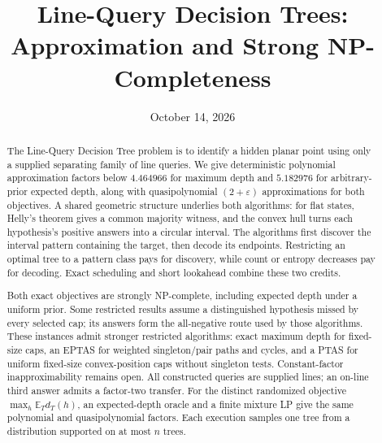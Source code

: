 \documentclass[11pt]{article}
\title{Line-Query Decision Trees:\\
Approximation and Strong NP-Completeness}
\author{}
\date{October 14, 2026}
\theoremstyle{definition}
\theoremstyle{remark}
\begin{document}
\maketitle

\begin{abstract}
The Line-Query Decision Tree problem is to identify a hidden planar
point using only a supplied separating family of line queries. We give
deterministic polynomial approximation factors below $4.464966$ for
maximum depth and $5.182976$ for arbitrary-prior expected depth, along
with quasipolynomial
$(2+\varepsilon)$ approximations for both objectives. A shared
geometric structure underlies both algorithms: for flat states,
Helly's theorem gives a common majority witness, and
the convex hull turns each hypothesis's positive answers into a
circular interval. The algorithms first discover the interval pattern
containing the target, then decode its endpoints. Restricting an
optimal tree to a pattern class pays for discovery, while count or
entropy decreases pay for decoding. Exact scheduling and short
lookahead combine these two credits.

Both exact objectives are strongly NP-complete, including expected
depth under a uniform prior. Some restricted results assume a
distinguished hypothesis missed by every selected cap; its answers
form the all-negative route used by those algorithms. These instances
admit stronger restricted algorithms: exact maximum depth for fixed-size
caps, an EPTAS for weighted singleton/pair paths and cycles, and a PTAS
for uniform fixed-size convex-position caps without singleton tests.
Constant-factor inapproximability remains open. All constructed queries
are supplied lines; an on-line third answer admits a factor-two transfer.
For the distinct randomized objective $\max_h\mathbb E_T d_T(h)$,
an expected-depth oracle and a finite mixture LP give the same
polynomial and quasipolynomial factors. Each execution samples one
tree from a distribution supported on at most $n$ trees.
\end{abstract}

\setcounter{tocdepth}{2}
\begingroup
\small
\tableofcontents
\endgroup
\clearpage

















\appendix


\end{document}
